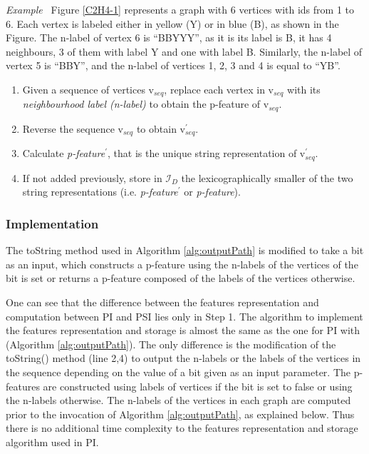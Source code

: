 \documentclass{l4proj}
\newcounter{example}[section]
\newenvironment{example}[1][]{\refstepcounter{example}\par\medskip
   \noindent \textit{Example~\theexample #1} \rmfamily}{\medskip}
\newcommand{\fancyI}{\mathcal{I}}
\begin{document}
\begin{example}
\label{ex:nlabel}
Figure \ref{C2H4-1} represents a graph with 6 vertices with ids from 1 to 6. Each vertex is labeled either in yellow (Y) or in blue (B), as shown in the Figure. The n-label of vertex 6 is ``BBYYY'', as it is its label is B, it has 4 neighbours, 3 of them with label Y and one with label B. Similarly, the n-label of vertex 5 is ``BBY'', and the n-label of vertices 1, 2, 3 and 4 is equal to ``YB''.
\end{example}

\begin{enumerate}
\item Given a sequence of vertices v$_{seq}$, replace each vertex in v$_{seq}$ with its \emph{neighbourhood label (n-label)} to obtain the p-feature of v$_{seq}$.
\item Reverse the sequence v$_{seq}$ to obtain v$_{seq}^{\prime}$.
\item Calculate \emph{p-feature}$^{\prime}$, that is the unique string representation of v$_{seq}^{\prime}$.
\item If not added previously, store in $\fancyI_{D}$ the lexicographically smaller of the two string representations (i.e. \emph{p-feature}$^{\prime}$ or \emph{p-feature}).
\end{enumerate}

\subsubsection{Implementation}

The toString method used in Algorithm \ref{alg:outputPath} is modified to take a bit as an input, which constructs a p-feature using the n-labels of the vertices of the bit is set or returns a p-feature composed of the labels of the vertices otherwise.

One can see that the difference between the features representation and computation between PI and PSI lies only in Step 1. The algorithm to implement the features representation and storage is almost the same as the one for PI with (Algorithm \ref{alg:outputPath}). The only difference is the modification of the toString() method (line 2,4) to output the n-labels or the labels of the vertices in the sequence depending on the value of a bit given as an input parameter. The p-features are constructed using labels of vertices if the bit is set to false or using the n-labels otherwise. The n-labels of the vertices in each graph are computed prior to the invocation of Algorithm \ref{alg:outputPath}, as explained below. Thus there is no additional time complexity to the features representation and storage algorithm used in PI.
\end{document}
